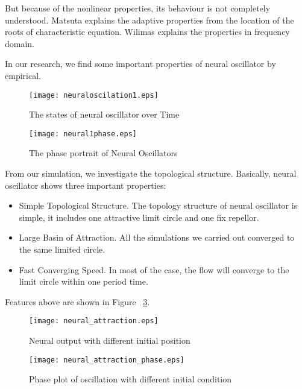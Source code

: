 But because of the nonlinear properties, its behaviour is not completely understood. 
Matsuta\citep{Matsuoka1987} explains the adaptive properties from the location of the roots of characteristic equation. 
Wilimas\citep{Williamson1998} explains the properties in frequency domain.



In our research, we find some important properties of neural oscillator by empirical.

\begin{figure}
\begin{center}
\texttt{[image: neuraloscilation1.eps]}
\end{center}
\caption{The states of neural oscillator over Time}
\label{fig:oscilation}
\end{figure}

\begin{figure}
\begin{center}
\texttt{[image: neural1phase.eps]}
\end{center}
\caption{The phase portrait of Neural Oscillators}
\label{fig:oscilationphase}
\end{figure}

From our simulation, we investigate the topological structure.
Basically, neural oscillator shows three important properties:
\begin{itemize}
\item{Simple Topological Structure.}
The topology structure of neural oscillator is simple, 
it includes one  attractive limit circle and one fix repellor.
\item{Large Basin of Attraction.}
All the simulations we carried out converged to the same limited circle.
\item{Fast Converging Speed.}
In most of the case, the flow will converge to the limit circle within one period time.
\end{itemize}

Features above are shown in Figure ~\ref{fig:time_timeAttraction}.
\begin{figure}
\begin{center}
\texttt{[image: neural\_attraction.eps]}
\end{center}
\caption{Neural output with different initial position}
\label{fig:time_timeAttraction}
\end{figure}

\begin{figure}
\begin{center}
\texttt{[image: neural\_attraction\_phase.eps]}
\end{center}
\caption{Phase plot of oscillation with different initial condition}
\label{fig:phase_attraction}
\end{figure}
 

